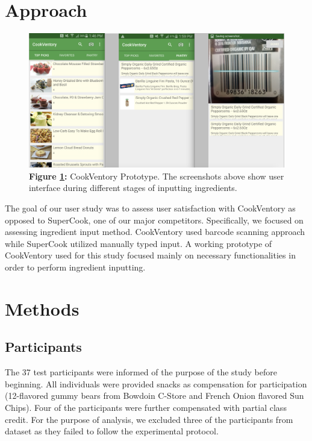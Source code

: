 \documentclass{sigchi}
\begin{document}
\section{Approach}\label{Approach}
	\begin{figure}[htb!]
	\centering
		\includegraphics[width=0.8\columnwidth]{prototype.png}\\
		\textbf{Figure \ref{fig:prototype}:} CookVentory Prototype. The screenshots above show user interface during different stages of inputting ingredients.
		\label{fig:prototype}
	\end{figure}

	The goal of our user study was to assess user satisfaction with CookVentory as opposed to SuperCook, one of our major competitors. Specifically, we focused on assessing ingredient input method. CookVentory used barcode scanning approach while SuperCook utilized manually typed input. A working prototype of CookVentory used for this study focused mainly on necessary functionalities in order to perform ingredient inputting.

\section{Methods}\label{methods}
\subsection{Participants}
	 The 37 test participants were informed of the purpose of the study before beginning. All individuals were provided snacks as compensation for participation (12-flavored gummy bears from Bowdoin C-Store and French Onion flavored Sun Chips). Four of the participants were further compensated with partial class credit. For the purpose of analysis, we excluded three of the participants from dataset as they failed to follow the experimental protocol.
\end{document}
